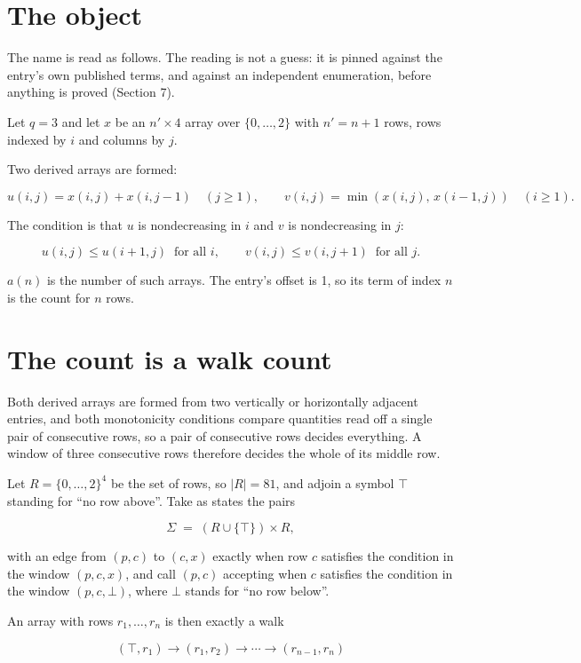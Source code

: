 \documentclass[11pt]{article}
\theoremstyle{definition}
\begin{document}
\section{The object}

The name is read as follows. The reading is not a guess: it is pinned against the entry's own published terms, and against an independent enumeration, before anything is proved (Section 7).

Let $q = 3$ and let $x$ be an $n' \times 4$ array over $\{0,\dots,2\}$ with $n' = n + 1$ rows, rows indexed by $i$ and columns by $j$.

Two derived arrays are formed:

\[u(i,j) = x(i,j) + x(i,j{-}1)\quad (j \ge 1), \qquad v(i,j) = \min(x(i,j),\,x(i{-}1,j))\quad (i \ge 1).\]

The condition is that $u$ is nondecreasing in $i$ and $v$ is nondecreasing in $j$:

\[u(i,j) \le u(i{+}1,j) \ \text{ for all } i, \qquad v(i,j) \le v(i,j{+}1) \ \text{ for all } j.\]

$a(n)$ is the number of such arrays. The entry's offset is 1, so its term of index $n$ is the count for $n$ rows.

\section{The count is a walk count}

Both derived arrays are formed from two vertically or horizontally adjacent entries, and both monotonicity conditions compare quantities read off a single pair of consecutive rows, so a pair of consecutive rows decides everything. A window of three consecutive rows therefore decides the whole of its middle row.

Let $R = \{0,\dots,2\}^{4}$ be the set of rows, so $|R| = 81$, and adjoin a symbol $\top$ standing for ``no row above''. Take as states the pairs

\[\Sigma \;=\; (R \cup \{\top\}) \times R,\]

with an edge from $(p,c)$ to $(c,x)$ exactly when row $c$ satisfies the condition in the window $(p,c,x)$, and call $(p,c)$ accepting when $c$ satisfies the condition in the window $(p,c,\bot)$, where $\bot$ stands for ``no row below''.

An array with rows $r_1,\dots,r_n$ is then exactly a walk

\[(\top,r_1) \to (r_1,r_2) \to \cdots \to (r_{n-1},r_n)\]
\end{document}
